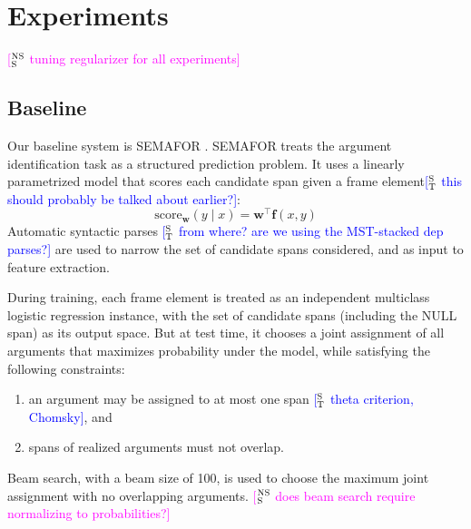 \documentclass[11pt,a4paper]{article}
\newcommand{\ensuretext}[1]{#1}
\newcommand{\nssmarker}{\ensuretext{\textcolor{magenta}{\ensuremath{^{\textsc{NS}}_{\textsc{S}}}}}}
\newcommand{\stmarker}{\ensuretext{\textcolor{blue}{\ensuremath{^{\textsc{S}}_{\textsc{T}}}}}}
\newcommand{\arkcomment}[3]{\ensuretext{\textcolor{#3}{[#1 #2]}}}
\newcommand{\nss}[1]{\arkcomment{\nssmarker}{#1}{magenta}}
\newcommand{\st}[1]{\arkcomment{\stmarker}{#1}{blue}}
\newcommand{\term}[1]{\textbf{#1}} %
\begin{document}
\section{Experiments}

\nss{tuning regularizer for all experiments}




\subsection{Baseline}


Our baseline system is SEMAFOR \citep{das-14}.
SEMAFOR treats the argument identification task as a structured prediction problem.
It uses a linearly parametrized model that scores each candidate span given a frame element\st{this should probably be talked about earlier?}:
\begin{equation}
\text{score}_\mathbf{w}(y \mid x) = \mathbf{w}^\top \mathbf{f}(x, y)
\end{equation}
Automatic syntactic parses \st{from where? are we using the MST-stacked dep parses?} are used to narrow the set of candidate spans considered, and as input to feature extraction.

During training, each frame element is treated as an independent multiclass logistic regression instance, with the set of candidate spans (including the \textsc{NULL} span) as its output space.
But at test time, it chooses a joint assignment of all arguments that maximizes probability under the model, while satisfying the following constraints:
\begin{enumerate}
  \item an argument may be assigned to at most one span \st{theta criterion, Chomsky}, and
  \item spans of realized arguments must not overlap.
\end{enumerate}
Beam search, with a beam size of 100, is used to choose the maximum joint assignment with no overlapping arguments.
\nss{does beam search require normalizing to probabilities?}
\end{document}
